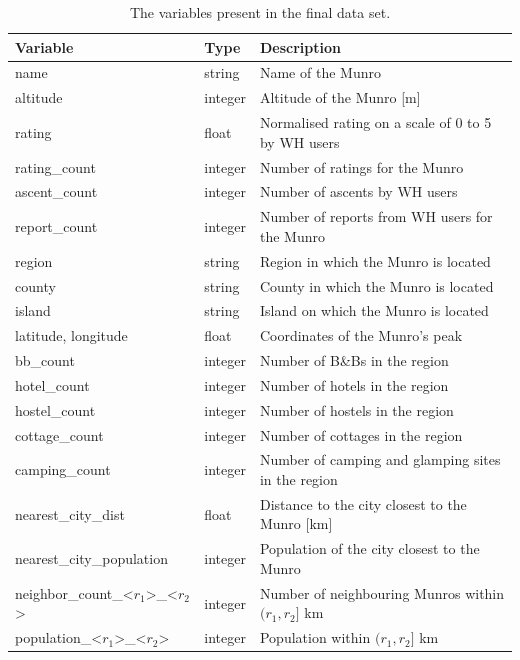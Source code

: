 \documentclass[11pt,a4paper]{article}
\begin{document}
\begin{table}
    \caption{The variables present in the final data set.}
    \label{table:1}
    \centering
    \begin{tabular}{l  l  l} 
        \toprule
        Variable & Type & Description  \\ 
        \midrule
        name & string & Name of the Munro \\ 
        altitude & integer & Altitude of the Munro [m] \\
        \hline
        rating & float & Normalised rating on a scale of 0 to 5 by WH users\\
        rating\_count & integer & Number of ratings for the Munro \\
        ascent\_count & integer & Number of ascents by WH users\\
        report\_count & integer & Number of reports from WH users for the Munro\\
        \hline
        region & string & Region in which the Munro is located \\
        county & string & County in which the Munro is located\\
        island & string & Island on which the Munro is located\\
        latitude, longitude & float & Coordinates of the Munro's peak\\
        \hline
        bb\_count & integer & Number of B\&Bs in the region\\
        hotel\_count & integer & Number of hotels in the region\\
        hostel\_count & integer & Number of hostels in the region\\
        cottage\_count & integer & Number of cottages in the region\\
        camping\_count & integer & Number of camping and glamping sites in the region\\
        \hline
        nearest\_city\_dist & float & Distance to the city closest to the Munro [km]\\
        nearest\_city\_population & integer & Population of the city closest to the Munro\\
        neighbor\_count\_<$r_1$>\_<$r_2$> & integer & Number of neighbouring Munros within $(r_1,r_2]$ km\\
        population\_<$r_1$>\_<$r_2$> & integer & Population within $(r_1,r_2]$ km\\
        \bottomrule
    \end{tabular}
\end{table}
\end{document}
